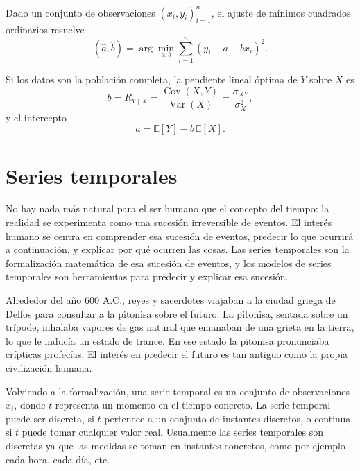 \documentclass[12pt]{report} %
\begin{document}
Dado un conjunto de observaciones $(x_i,y_i)_{i=1}^{n}$, el ajuste de mínimos cuadrados ordinarios resuelve
\begin{equation}
    (\hat{a},\hat{b})=\arg\min_{a,b}\sum_{i=1}^{n}(y_i-a-bx_i)^2.
    \label{eq:ols_objective_simple_stat}
\end{equation}

Si los datos son la población completa, la pendiente lineal óptima de $Y$ sobre $X$ es
\begin{equation}
    b=R_{Y\mid X}=\frac{\operatorname{Cov}(X,Y)}{\operatorname{Var}(X)}
    =\frac{\sigma_{XY}}{\sigma^2_X},
    \label{eq:population_slope_from_cov_stat}
\end{equation}
y el intercepto
\begin{equation}
    a=\mathbb{E}[Y]-b\,\mathbb{E}[X].
    \label{eq:population_intercept_stat}
\end{equation}

\section{Series temporales}

No hay nada más natural para el ser humano que el concepto del tiempo: la realidad se experimenta como una sucesión irreversible de eventos. El interés humano se centra en comprender esa sucesión de eventos, predecir lo que ocurrirá a continuación, y explicar por qué ocurren las cosas. Las series temporales son la formalización matemática de esa sucesión de eventos, y los modelos de series temporales son herramientas para predecir y explicar esa sucesión.

Alrededor del año 600 A.C., reyes y sacerdotes viajaban a la ciudad griega de Delfos para consultar a la pitonisa sobre el futuro. La pitonisa, sentada sobre un trípode, inhalaba vapores de gas natural que emanaban de una grieta en la tierra, lo que le inducía un estado de trance. En ese estado la pitonisa pronunciaba crípticas profecías\cite{deBoer2001}. El interés en predecir el futuro es tan antiguo como la propia civilización humana.

Volviendo a la formalización, una serie temporal es un conjunto de observaciones $x_t$, donde $t$ representa un momento en el tiempo concreto. La serie temporal puede ser discreta, si $t$ pertenece a un conjunto de instantes discretos, o continua, si $t$ puede tomar cualquier valor real. Usualmente las series temporales son discretas ya que las medidas se toman en instantes concretos, como por ejemplo cada hora, cada día, etc.
\end{document}
